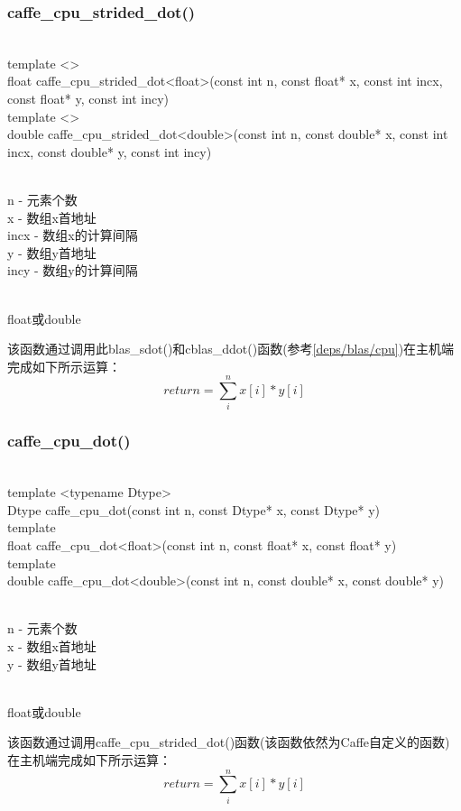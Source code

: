 \subsubsection{caffe\_cpu\_strided\_dot()}
\begin{cnfrmfunc}
   \item{}\\
     template <>\\
     float caffe\_cpu\_strided\_dot<float>(const int n, const float* x, const int incx, const float* y, const int incy)\\

     template <>\\
     double caffe\_cpu\_strided\_dot<double>(const int n, const double* x, const int incx, const double* y, const int incy)
   \item{}\\
     n - 元素个数\\
     x - 数组x首地址\\
     incx - 数组x的计算间隔\\
     y - 数组y首地址\\
     incy - 数组y的计算间隔
   \item{}\\
     float或double
\end{cnfrmfunc}
该函数通过调用此blas\_sdot()和cblas\_ddot()函数(参考\ref{deps/blas/cpu})在主机端完成如下所示运算：
$$
return = \sum\limits_{i}^{n} x[i]*y[i]
$$
\subsubsection{caffe\_cpu\_dot()}
\begin{cnfrmfunc}
   \item{}\\
     template <typename Dtype>\\
     Dtype caffe\_cpu\_dot(const int n, const Dtype* x, const Dtype* y)\\

     template\\
     float caffe\_cpu\_dot<float>(const int n, const float* x, const float* y)\\

     template\\
     double caffe\_cpu\_dot<double>(const int n, const double* x, const double* y)
   \item{}\\
     n - 元素个数\\
     x - 数组x首地址\\
     y - 数组y首地址
   \item{}\\
     float或double
\end{cnfrmfunc}
该函数通过调用caffe\_cpu\_strided\_dot()函数(该函数依然为Caffe自定义的函数)在主机端完成如下所示运算：
$$
return = \sum\limits_{i}^{n} x[i]*y[i]
$$
